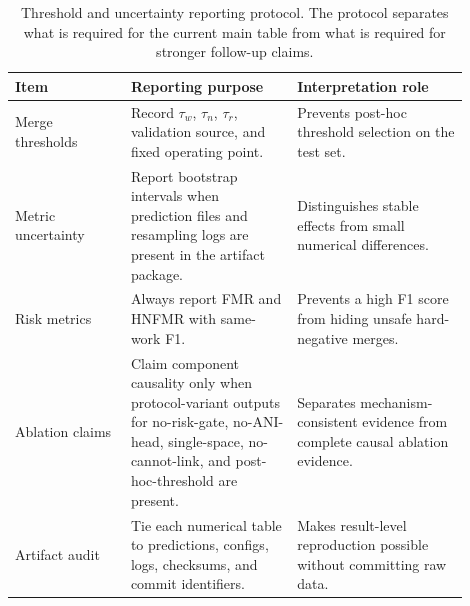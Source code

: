\documentclass[11pt]{article}
\begin{document}
\begin{table}[H]
\caption{Threshold and uncertainty reporting protocol. The protocol separates what is required for the current main table from what is required for stronger follow-up claims.}
\label{tab:threshold-uncertainty-protocol}
\centering
\small
\begin{tabular}{L{0.23\linewidth}L{0.33\linewidth}L{0.34\linewidth}}
\toprule
Item & Reporting purpose & Interpretation role \\
\midrule
Merge thresholds & Record $\tau_w$, $\tau_n$, $\tau_r$, validation source, and fixed operating point. & Prevents post-hoc threshold selection on the test set. \\
Metric uncertainty & Report bootstrap intervals when prediction files and resampling logs are present in the artifact package. & Distinguishes stable effects from small numerical differences. \\
Risk metrics & Always report FMR and HNFMR with same-work F1. & Prevents a high F1 score from hiding unsafe hard-negative merges. \\
Ablation claims & Claim component causality only when protocol-variant outputs for no-risk-gate, no-ANI-head, single-space, no-cannot-link, and post-hoc-threshold are present. & Separates mechanism-consistent evidence from complete causal ablation evidence. \\
Artifact audit & Tie each numerical table to predictions, configs, logs, checksums, and commit identifiers. & Makes result-level reproduction possible without committing raw data. \\
\bottomrule
\end{tabular}
\end{table}
\end{document}
